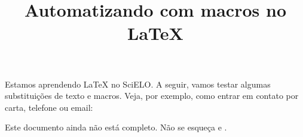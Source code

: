 \documentclass[a4paper]{article}
\title{Automatizando com macros no \LaTeX}
\author{\scielo}
\newcommand{\scielo}{SciELO\xspace}
\begin{document}
\frenchspacing

Estamos aprendendo \LaTeX{} no \scielo. A seguir, vamos testar algumas
substituições de texto e macros. Veja, por exemplo, como entrar em contato por
carta, telefone ou email:


Este documento ainda não está completo. Não se esqueça  e .
\end{document}
